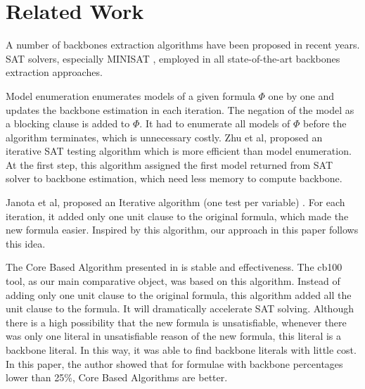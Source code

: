 \section{Related Work}\label{sec:relw}

A number of backbones extraction algorithms have been proposed in recent years. SAT solvers, especially MINISAT \cite{MINISAT}, employed in all state-of-the-art backbones extraction approaches.

Model enumeration\cite{MK2002,RSF2004} enumerates models of a given formula $\Phi$ one by one and updates the backbone estimation in each iteration. The negation of the model as a blocking clause is added to $\Phi$. It had to enumerate all models of $\Phi$ before the algorithm terminates, which is unnecessary costly.
Zhu et al, proposed an iterative SAT testing algorithm \cite{Z11} which is more efficient than model enumeration. At the first step, this algorithm assigned the first model returned from SAT solver to backbone estimation, which need less memory to compute backbone.

Janota et al, proposed an Iterative algorithm (one test per variable) \cite{JLM15}. For each iteration, it added only one unit clause to the original formula, which made the new formula easier. Inspired by this algorithm, our approach in this paper follows this idea.

The Core Based Algorithm presented in \cite{JLM15} is stable and effectiveness. The cb100 tool, as our main comparative object, was based on this algorithm. Instead of adding only one unit clause to the original formula, this algorithm added all the unit clause to the formula. It will dramatically accelerate SAT solving. Although there is a high possibility that the new formula is unsatisfiable, whenever there was only one literal in unsatisfiable reason of the new formula, this literal is a backbone literal. In this way, it was able to find backbone literals with little cost. In this paper, the author showed that for formulae with backbone percentages lower than 25\%, Core Based Algorithms are better.
